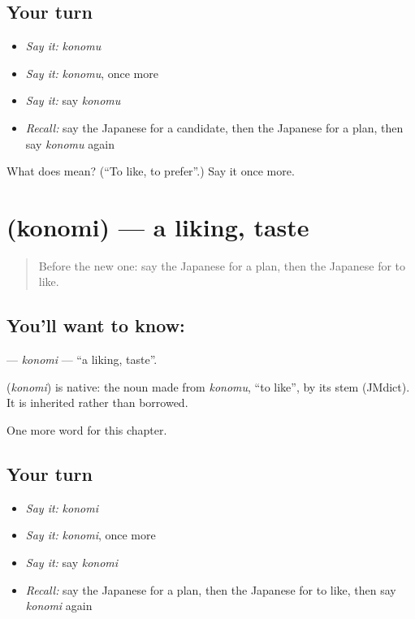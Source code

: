 \subsection*{Your turn}
\begin{itemize}
\raggedright
  \item \emph{Say it:} \emph{konomu}
  \item \emph{Say it:} \emph{konomu}, once more
  \item \emph{Say it:} say \emph{konomu}
  \item \emph{Recall:} say the Japanese for a candidate, then the Japanese for a plan, then say \emph{konomu} again
\end{itemize}

\begin{tcolorbox}[breakable,colback=teal!4,colframe=teal!35!black,title={Before you move on}]
What does  mean? (\textquotedblleft{}To like, to prefer\textquotedblright{}.) Say it once more.
\end{tcolorbox}
\section[\texorpdfstring{\ja{このみ} (konomi)}{このみ (konomi)}]{ (konomi) — a liking, taste}

\label{lesson:JA-C94-konomi}



\begin{quote}
Before the new one: say the Japanese for a plan, then the Japanese for to like.
\end{quote}

\subsection*{You'll want to know: }
\textbf{} — \emph{konomi} — \textquotedblleft{}a liking, taste\textquotedblright{}.

\begin{cousinweb}
\textbf{} (\emph{konomi}) is native: the noun made from \emph{konomu}, \textquotedblleft{}to like\textquotedblright{}, by its stem (JMdict). It is inherited rather than borrowed.
\end{cousinweb}

\begin{grammarlens}[title={What you've built}]
One more word for this chapter.
\end{grammarlens}

\subsection*{Your turn}
\begin{itemize}
\raggedright
  \item \emph{Say it:} \emph{konomi}
  \item \emph{Say it:} \emph{konomi}, once more
  \item \emph{Say it:} say \emph{konomi}
  \item \emph{Recall:} say the Japanese for a plan, then the Japanese for to like, then say \emph{konomi} again
\end{itemize}

